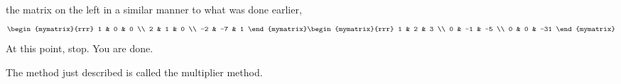 \begin{solution}
the matrix on the left in a similar manner to what was done earlier,
\begin{equation*}
\begin{mymatrix}{rrr}
1 & 0 & 0 \\
2 & 1 & 0 \\
-2 & -7 & 1
\end{mymatrix} \begin{mymatrix}{rrr}
1 & 2 & 3 \\
0 & -1 & -5 \\
0 & 0 & -31
\end{mymatrix}
\end{equation*}
At this point, stop. You are done.
\end{solution}

The method just described is called the
multiplier method.
